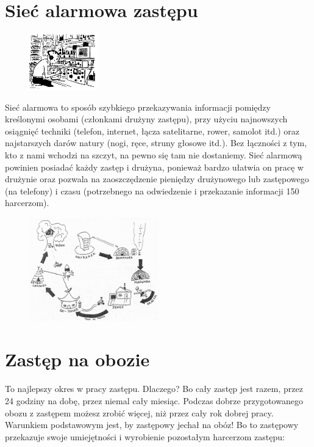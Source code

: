 \section{Sieć alarmowa zastępu}
\begin{figure}
\begin{center}
\includegraphics[width=3cm]{grafiki/nasluch.png}
\end{center}
\end{figure}Sieć alarmowa to sposób szybkiego przekazywania informacji pomiędzy kreślonymi osobami (członkami drużyny zastępu), przy użyciu najnowszych osiągnięć techniki (telefon, internet, łącza satelitarne, rower, samolot  itd.) oraz najstarszych darów natury (nogi, ręce, struny głosowe itd.). Bez łączności z tym, kto z nami wchodzi na szczyt, na pewno się tam nie dostaniemy. Sieć alarmową powinien posiadać każdy zastęp i drużyna, ponieważ bardzo ułatwia on pracę w drużynie oraz pozwala na zaoszczędzenie pieniędzy drużynowego lub zastępowego (na  telefony)  i czasu (potrzebnego na odwiedzenie i przekazanie informacji 150 harcerzom).

\begin{figure}[h]
\begin{center}
\includegraphics[width=0.5\textwidth]{grafiki/siec.png}
\end{center}
\end{figure}


\section{Zastęp na obozie}
To najlepszy okres w pracy zastępu. Dlaczego? Bo cały zastęp jest razem, przez  24 godziny na dobę, przez niemal cały miesiąc. Podczas dobrze przygotowanego obozu z zastępem możesz zrobić więcej, niż przez cały rok dobrej pracy.
	Warunkiem podstawowym jest, by zastępowy jechał na obóz! Bo to zastępowy przekazuje swoje umiejętności i wyrobienie pozostałym harcerzom zastępu:

